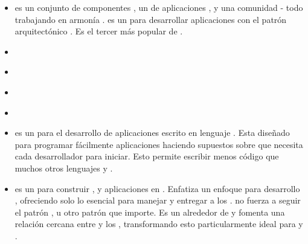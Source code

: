 \begin{itemize}
			\item \textbf{\symfonyNAME} es un conjunto de componentes \phpNAME, un \frameworkPC de aplicaciones \webINT, y una comunidad - todo trabajando en armonía \cite{online_technology_officialsite_symfony}. \symfonyNAME es un \softwarePC \freePC para desarrollar aplicaciones con el patrón arquitectónico \mvcAS. Es el tercer \frameworkPC más popular de \phpNAME \cite{online_popularity_php_proyects}.
			\item \textbf{\drupalNAME}
			\item \textbf{\zendNAME}
			\item \textbf{\yiiNAME}
			\item \textbf{\wordPressNAME}

			\item
				\textbf{\rubyonrailsNAME} es un \frameworkPC para el desarrollo de aplicaciones \webINT escrito en lenguaje \rubyNAME. Esta diseñado para programar fácilmente aplicaciones \webINT haciendo supuestos sobre que necesita cada desarrollador para iniciar. Esto permite escribir menos código que muchos otros lenguajes y \frameworksPC \cite{online_technology_rubyonrails}.

			\item
				\textbf{\sinatraNAME} es un \domainSpecificLangPL para construir \websitesINT, \webServiceINT y aplicaciones \webINT en \rubyNAME. Enfatiza un enfoque para desarrollo \minimalisticQA, ofreciendo solo lo esencial para manejar \httpNAME \requestINT y entregar \responsesINT a los \clientsAS. \sinatraNAME no fuerza a seguir el patrón \modelViewConAS, u otro patrón que importe. Es un \wrapperAS \lightweightPL alrededor de \rackMiddleRubyAS y fomenta una relación cercana entre \serviceCPT \apiendpointsAS y los \httpVerbsAS, transformando esto particularmente ideal para \webServicesINT y \apisAS \cite{book_sinatra_oreilly}.


\end{itemize}
